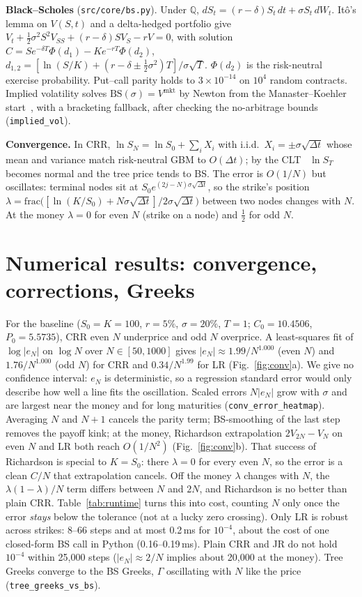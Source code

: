 \documentclass[10pt,a4paper]{article}
\newcommand{\code}[1]{\texttt{\small #1}}
\begin{document}
\textbf{Black--Scholes} (\code{src/core/bs.py}). Under $\mathbb Q$, $dS_t=(r-\delta)S_t\,dt+\sigma S_t\,dW_t$. Itô's
lemma on $V(S,t)$ and a delta-hedged portfolio give
$V_t+\tfrac12\sigma^2S^2V_{SS}+(r-\delta)SV_S-rV=0$, with solution
$C=Se^{-\delta T}\Phi(d_1)-Ke^{-rT}\Phi(d_2)$, $d_{1,2}=[\ln(S/K)+(r-\delta\pm\tfrac12\sigma^2)T]/\sigma\sqrt T$.
$\Phi(d_2)$ is the risk-neutral exercise probability. Put--call parity holds to $3\times10^{-14}$ on $10^4$ random
contracts. Implied volatility solves $\mathrm{BS}(\sigma)=V^{\text{mkt}}$ by Newton from the Manaster--Koehler start~\cite{mk},
with a bracketing fallback, after checking the no-arbitrage bounds (\code{implied\_vol}).

\textbf{Convergence.} In CRR, $\ln S_N=\ln S_0+\sum_i X_i$ with i.i.d.\ $X_i=\pm\sigma\sqrt{\Delta t}$ whose mean and
variance match risk-neutral GBM to $O(\Delta t)$; by the CLT~\cite{hull} $\ln S_T$ becomes normal and the tree price tends to BS.
The error is $O(1/N)$ but oscillates: terminal nodes sit at $S_0e^{(2j-N)\sigma\sqrt{\Delta t}}$, so the strike's
position $\lambda=\mathrm{frac}\big([\ln(K/S_0)+N\sigma\sqrt{\Delta t}]/2\sigma\sqrt{\Delta t}\big)$ between two nodes
changes with $N$. At the money $\lambda=0$ for even $N$ (strike on a node) and $\tfrac12$ for odd $N$.

\section{Numerical results: convergence, corrections, Greeks}
For the baseline ($S_0=K=100$, $r=5\%$, $\sigma=20\%$, $T=1$; $C_0=10.4506$, $P_0=5.5735$), CRR even $N$
underprice and odd $N$ overprice. A least-squares fit of $\log|e_N|$ on $\log N$ over $N\in[50,1000]$ gives
$|e_N|\approx 1.99/N^{1.000}$ (even $N$) and $1.76/N^{1.000}$ (odd $N$) for CRR and $0.34/N^{1.99}$ for LR
(Fig.~\ref{fig:conv}a). We give no confidence interval: $e_N$ is deterministic, so a regression standard error would
only describe how well a line fits the oscillation. Scaled errors
$N|e_N|$ grow with $\sigma$ and are largest near the money and for long maturities (\code{conv\_error\_heatmap}).
Averaging $N$ and $N{+}1$ cancels the parity term; BS-smoothing of the last step removes the payoff kink;
at the money, Richardson extrapolation $2V_{2N}-V_N$ on even $N$ and LR both reach $O(1/N^2)$ (Fig.~\ref{fig:conv}b).
That success of Richardson is special to $K=S_0$: there $\lambda=0$ for every even $N$, so the error is a clean $C/N$
that extrapolation cancels. Off the money $\lambda$ changes with $N$, the $\lambda(1-\lambda)/N$ term differs between
$N$ and $2N$, and Richardson is no better than plain CRR. Table~\ref{tab:runtime} turns this into cost, counting $N$
only once the error \emph{stays} below the tolerance (not at a lucky zero crossing). Only LR is robust across
strikes: 8--66 steps and at most 0.2\,ms for $10^{-4}$, about the cost of one closed-form BS call in Python
(0.16--0.19\,ms). Plain CRR and JR do not hold $10^{-4}$ within 25{,}000 steps ($|e_N|\approx2/N$ implies about
20{,}000 at the money). Tree Greeks
converge to the BS Greeks, $\Gamma$ oscillating with $N$ like the price (\code{tree\_greeks\_vs\_bs}).
\end{document}

